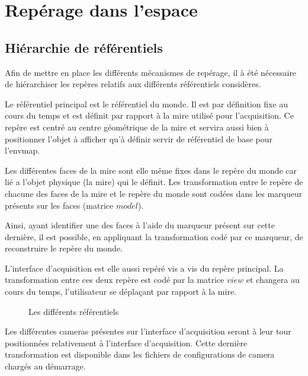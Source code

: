 \documentclass[10pt,a4paper,twoside, twocolumn]{report}
\newcommand*{\rootPath}{../}
\begin{document}
\chapter{Repérage dans l'espace}


\section{Hiérarchie de référentiels}

Afin de mettre en place les différents mécanismes de repérage, il à été nécessaire de hiérarchiser les repères relatifs aux différents référentiels considères.

Le référentiel principal est le référentiel du monde. Il est par définition fixe au cours du temps et est définit par rapport à la mire utilisé pour l'acquisition. Ce repère est centré au centre géométrique de la mire et servira aussi bien à positionner l'objet à afficher qu'à définir servir de référentiel de base pour l'envmap.

Les différentes faces de la mire sont elle même fixes dans le repère du monde car lié a l'objet physique (la mire) qui le définit. Les transformation entre le repère de chacune des faces de la mire et le repère du monde sont codées dans les marqueur présents sur les faces (matrice $model$).

Ainsi, ayant identifier une des faces à l'aide du marqueur présent sur cette dernière, il est possible, en appliquant la transformation codé par ce marqueur, de reconstruire le repère du monde.

L'interface d'acquisition est elle aussi repéré vis a vis du repère principal. La transformation entre ces deux repère est codé par la matrice $view$ et changera au cours du temps, l'utilisateur se déplaçant par rapport à la mire.

\begin{figure}[!ht]
	\centering
	
	\caption{Les différents référentiels}
	\label{fig:tikz:spaceHierarchie}
\end{figure}

Les différentes cameras présentes sur l'interface d'acquisition seront à leur tour positionnées relativement à l'interface d'acquisition. Cette dernière transformation est disponible dans les fichiers de configurations de camera chargés au démarrage.
\end{document}
